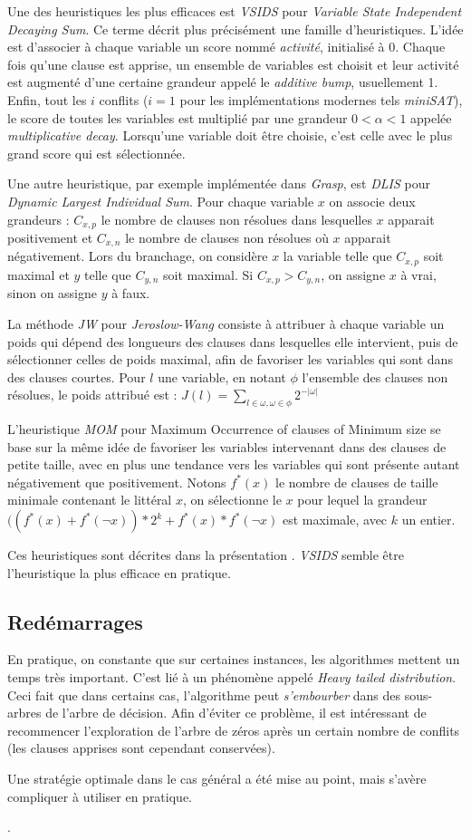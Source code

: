 Une des heuristiques les plus efficaces est \emph{VSIDS} pour \emph{Variable
State Independent Decaying Sum}. Ce terme décrit plus précisément une famille
d'heuristiques. L'idée est d'associer à chaque variable un score nommé
\emph{activité}, initialisé à $0$. Chaque fois qu'une clause est apprise,
un ensemble de variables est choisit et leur activité est augmenté d'une
certaine grandeur appelé le \emph{additive bump}, usuellement 1. Enfin, tout
les $i$ conflits ($i=1$ pour les implémentations modernes tels \emph{miniSAT}),
le score de toutes les variables est multiplié par une grandeur
$0 < \alpha < 1$ appelée \emph{multiplicative decay}. Lorsqu'une variable doit
être choisie, c'est celle avec le plus grand score qui est sélectionnée.

Une autre heuristique, par exemple implémentée dans \emph{Grasp}, est
\emph{DLIS} pour \emph{Dynamic Largest Individual Sum}. Pour chaque variable
$x$ on associe deux grandeurs : $C_{x,p}$ le nombre de clauses non résolues
dans lesquelles $x$ apparait positivement et $C_{x,n}$ le nombre de clauses non
résolues où $x$ apparait négativement. Lors du branchage, on considère $x$ la
variable telle que $C_{x,p}$ soit maximal et $y$ telle que $C_{y,n}$ soit
maximal. Si $C_{x,p} > C_{y,n}$, on assigne $x$ à vrai, sinon on assigne $y$ à
faux.

La méthode \emph{JW} pour \emph{Jeroslow-Wang} consiste à attribuer à chaque
variable un poids qui dépend des longueurs des clauses dans lesquelles elle
intervient, puis de sélectionner celles de poids maximal, afin de favoriser
les variables qui sont dans des clauses courtes. Pour $l$ une variable, en
notant $\phi$ l'ensemble des clauses non résolues, le poids attribué est :
$J(l) = \sum_{l\in\omega,\omega\in\phi} 2^{-|\omega|}$

L'heuristique \emph{MOM} pour {Maximum Occurrence of clauses of Minimum size}
se base sur la même idée de favoriser les variables intervenant dans des
clauses de petite taille, avec en plus une tendance vers les variables qui
sont présente autant négativement que positivement. Notons $f^*(x)$ le nombre
de clauses de taille minimale contenant le littéral $x$, on sélectionne le $x$
pour lequel la grandeur $((f^*(x) + f^*(\neg x)) * 2^k + f^*(x)*f^*(\neg x)$
est maximale, avec $k$ un entier.

Ces heuristiques sont décrites dans la présentation \cite{heuriSAT}.
\emph{VSIDS} semble être l'heuristique la plus efficace en pratique\cite{VSIDS}.

\subsection{Redémarrages}\label{restart}
En pratique, on constante que sur certaines instances, les algorithmes mettent
un temps très important. C'est lié à un phénomène appelé \emph{Heavy tailed
distribution}. 
Ceci fait que dans certains cas, l'algorithme peut \emph{s'embourber} dans des
sous-arbres de l'arbre de décision. Afin d'éviter ce problème, il est
intéressant de recommencer l'exploration de l'arbre de zéros après un certain
nombre de conflits (les clauses apprises sont cependant conservées).

Une stratégie optimale dans le cas général a été mise au point\cite{luby93},
mais s'avère compliquer à utiliser en pratique.

.

